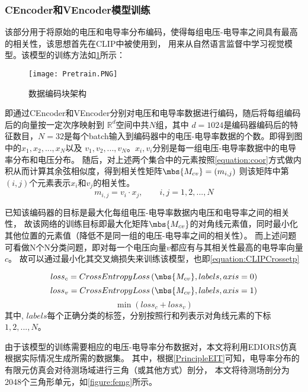 \subsubsection{CEncoder和VEncoder模型训练}
该部分用于将原始的电压和电导率分布编码，使得每组电压-电导率之间具有最高的相关性，该思想首先在CLIP中被使用到\cite{CLIP}，
用来从自然语言监督中学习视觉模型。该模型的训练方法如\cref{figure:Pretrain}所示：

\begin{figure}[H]
    \centering
    \texttt{[image: Pretrain.PNG]}
    \caption{数据编码块架构}
    \label{figure:Pretrain}
\end{figure}

即通过CEncoder和VEncoder分别对电压和电导率数据进行编码，随后将每组编码后的向量按一定次序映射到 $\mathbb{R}^d$空间中共$N$组，其中
$d=1024$是编码器编码后的特征数目，$N=32$是每个batch输入到编码器中的电压-电导率数据的个数。即得到图中的$x_1, x_2,...,x_N$以及
$v_1, v_2,..., v_N$。$x_i,v_i$分别是每一组电压-电导率数据中的电导率分布和电压分布。
随后，对上述两个集合中的元素按照\cref{equation:coor}方式做内积从而计算其余弦相似度，得到相关性矩阵$\mbs{M_{cv}}= \left(m_{i,j}\right)$
则该矩阵中第$(i,j)$个元素表示$x_i$和$v_j$的相关性。
\begin{equation}
    \label{equation:coor}
    m_{i,j} = v_{i} \cdot x_{j}, \qquad i,j=1,2,...,N
\end{equation}


已知该编码器的目标是最大化每组电压-电导率数据内电压和电导率之间的相关性，
故该网络的训练目标即最大化矩阵$\mbs{M_{cv}}$的对角线元素值，同时最小化其他位置的元素值（降低不是同一组的电压-电导率之间的相关性）。
而上述问题可看做N个N分类问题，即对每一个电压向量$v$都应有与其相关性最高的电导率向量$c$。
故可以通过最小化其交叉熵损失来训练该模型，也即\cref{equation:CLIPCrossetp}

\begin{equation}
    loss_c = CrossEntropyLoss \left(\mbs{M_{cv}}, labels, axis=0\right)
\end{equation}
\begin{equation}
    loss_v = CrossEntropyLoss \left(\mbs{M_{cv}}, labels, axis=1\right)
\end{equation}
\begin{equation}
    \label{equation:CLIPCrossetp}
    \min \left(loss_c + loss_v\right)
\end{equation}
其中, $labels$每个正确分类的标签，分别按照行和列表示对角线元素的下标$1,2,...,N$。

由于该模型的训练需要相应的电压-电导率分布数据对，本文将利用EDIORS仿真根据实际情况生成所需的数据集。
其中，根据\cref{PrincipleEIT}可知，电导率分布的有限元仿真会对待测场域进行三角（或其他方式）剖分，
本文将待测场剖分为2048个三角形单元，如\cref{figure:femg}所示。

